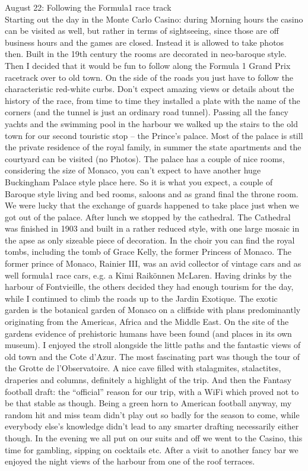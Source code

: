 August 22: Following the Formula1 race track\\
Starting out the day in the Monte Carlo Casino: during Morning hours the casino can be visited as well, but rather in terms of sightseeing, since those are off business hours and the games are closed. Instead it is allowed to take photos then. Built in the 19th century the rooms are decorated in neo-baroque style. Then I decided that it would be fun to follow along the Formula 1 Grand Prix racetrack over to old town. On the side of the roads you just have to follow the characteristic red-white curbs. Don't expect amazing views or details about the history of the race, from time to time they installed a plate with the name of the corners (and the tunnel is just an ordinary road tunnel). Passing all the fancy yachts and the swimming pool in the harbour we walked up the stairs to the old town for our second touristic stop -- the Prince's palace. Most of the palace is still the private residence of the royal family, in summer the state apartments and the courtyard can be visited (no Photos). The palace has a couple of nice rooms, considering the size of Monaco, you can't expect to have another huge Buckingham Palace style place here. So it is what you expect, a couple of Baroque style living and bed rooms, saloons and as grand final the throne room. We were lucky that the exchange of guards happened to take place just when we got out of the palace. After lunch we stopped by the cathedral. The Cathedral was finished in 1903 and built in a rather reduced style, with one large mosaic in the apse as only sizeable piece of decoration. In the choir you can find the royal tombs, including the tomb of Grace Kelly, the former Princess of Monaco. The former prince of Monaco, Rainier III, was an avid collector of vintage cars and as well formula1 race cars, e.g. a Kimi Raik\"onnen McLaren. Having drinks by the harbour of Fontvieille, the others decided they had enough tourism for the day, while I continued to climb the roads up to the Jardin Exotique. The exotic garden is the botanical garden of Monaco on a cliffside with plans predominantly originating from the Americas, Africa and the Middle East. On the site of the gardens evidence of prehistoric humans have been found (and places in its own museum). I enjoyed the stroll alongside the little paths and the fantastic views of old town and the Cote d'Azur. The most fascinating part was though the tour of the Grotte de l'Observatoire. A nice cave filled with stalagmites, stalactites, draperies and columns, definitely a highlight of the trip. And then the Fantasy football draft: the ``official'' reason for our trip, with a WiFi which proved not to be that stable as though. Being a green horn to American football anyway, my random hit and miss team didn't play out so badly for the season to come, while everybody else's knowledge didn't lead to any smarter drafting necessarily either though. In the evening we all put on our suits and off we went to the Casino, this time for gambling, sipping on cocktails etc. After a visit to another fancy bar we enjoyed the night views of the harbour from one of the roof terraces.\\

